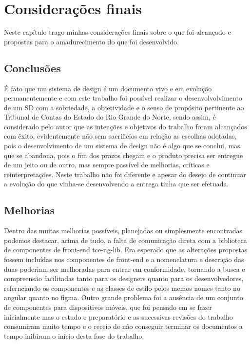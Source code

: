 \chapter[Capítulo 6]{Considerações finais}
\label{ch:cap6}

Neste capítulo trago minhas considerações finais sobre o que foi alcançado e propostas para o amadurecimento do que foi desenvolvido.

\section{Conclusões}\label{cap6:conclusao}

É fato que um sistema de design é um documento vivo e em evolução permanentemente e com este trabalho foi possível realizar o desenvolvolvimento de um SD com a sobriedade, a objetividade e o senso de propósito pertinente ao Tribunal de Contas do Estado do Rio Grande do Norte, sendo assim, é considerado pelo autor que as intenções e objetivos do trabalho foram alcançados com êxito, evidentemente não sem sacríficios em relação as escolhas adotadas, pois o desenvolvimento de um sistema de design não é algo que se conclui, mas que se abandona, pois o fim dos prazos chegam e o produto precisa ser entregue de um jeito ou de outro, mas sempre passível de melhorias, críticas e reinterpretações. Neste trabalho não foi diferente e apesar do desejo de continuar a evolução do que vinha-se desenvolvendo a entrega tinha que ser efetuada.

\section{Melhorias}\label{cap6:melhorias}

Dentro das muitas melhorias possíveis, planejadas ou simplesmente encontradas podemos destacar, acima de tudo, a falta de comunicação direta com a biblioteca de componentes de front-end tce-ng-lib. Era esperado que as alterações propostas fossem incluídas nos componentes de front-end e a nomenclatura e descrição das duas poderiam ser melhoradas para entrar em conformidade, tornando a busca e compreensão facilitadas tanto para os designers quanto para os desenvolvedores, refernciando os componentes e as classes de estilo pelos memos nomes tanto no angular quanto no figma. Outro grande problema foi a ausência de um conjunto de componentes para dispositivos móveis, que foi pensado em se fazer inicialmente mas o estudo e preparatório e as sucessivas revisões do trabalho consumiram muito tempo e o receio de não conseguir terminar os documentos a tempo inibiram o início desta fase do trabalho.

